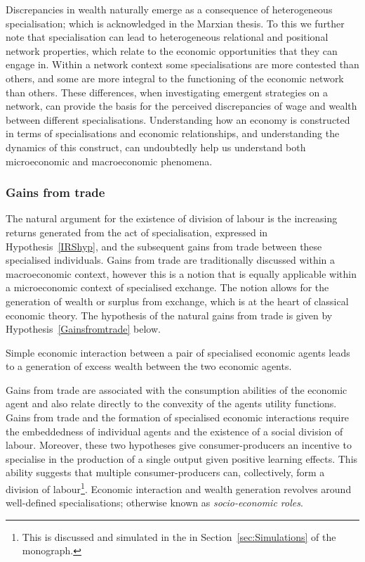 Discrepancies in wealth naturally emerge as a consequence of heterogeneous specialisation; which is acknowledged in the Marxian thesis. To this we further note that specialisation can lead to heterogeneous relational and positional network properties, which relate to the economic opportunities that they can engage in. Within a network context some specialisations are more contested than others, and some are more integral to the functioning of the economic network than others. These differences, when investigating emergent strategies on a network, can provide the basis for the perceived discrepancies of wage and wealth between different specialisations. Understanding how an economy is constructed in terms of specialisations and economic relationships, and understanding the dynamics of this construct, can undoubtedly help us understand both microeconomic and macroeconomic phenomena.

\subsubsection{Gains from trade}

The natural argument for the existence of division of labour is the increasing returns generated from the act of specialisation, expressed in Hypothesis~\ref{IRShyp}, and the subsequent gains from trade between these specialised individuals. Gains from trade are traditionally discussed within a macroeconomic context, however this is a notion that is equally applicable within a microeconomic context of specialised exchange. The notion allows for the generation of wealth or surplus from exchange, which is at the heart of classical economic theory. The hypothesis of the natural gains from trade is given by Hypothesis~\ref{Gainsfromtrade} below.

\begin{hypothesis} \label{Gainsfromtrade}
Simple economic interaction between a pair of specialised economic agents leads to a generation of excess wealth between the two economic agents.
\end{hypothesis}

Gains from trade are associated with the consumption abilities of the economic agent and also relate directly to the convexity of the agents utility functions. Gains from trade and the formation of specialised economic interactions require the embeddedness of individual agents and the existence of a social division of labour. Moreover, these two hypotheses give consumer-producers an incentive to specialise in the production of a single output given positive learning effects. This ability suggests that multiple consumer-producers can, collectively, form a division of labour\footnote{This is discussed and simulated in the in Section~\ref{sec:Simulations} of the monograph.}. Economic interaction and wealth generation revolves around well-defined specialisations; otherwise known as \emph{socio-economic roles}.

